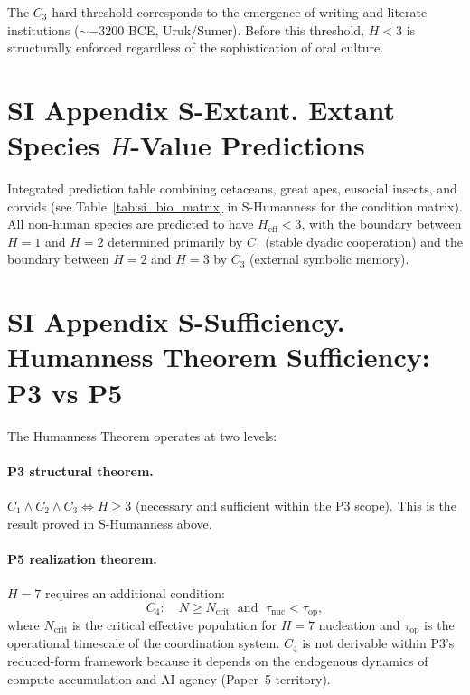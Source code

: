 \documentclass[11pt]{article}
\begin{document}
The $C_3$ hard threshold corresponds to the emergence of writing and literate institutions ($\sim -$3200 BCE, Uruk/Sumer).
Before this threshold, $H < 3$ is structurally enforced regardless of the sophistication of oral culture.


\section*{SI Appendix S-Extant. Extant Species $H$-Value Predictions}

Integrated prediction table combining cetaceans, great apes, eusocial insects, and corvids (see Table~\ref{tab:si_bio_matrix} in S-Humanness for the condition matrix).
All non-human species are predicted to have $H_{\mathrm{eff}} < 3$, with the boundary between $H=1$ and $H=2$ determined primarily by $C_1$ (stable dyadic cooperation) and the boundary between $H=2$ and $H=3$ by $C_3$ (external symbolic memory).


\section*{SI Appendix S-Sufficiency. Humanness Theorem Sufficiency: P3 vs P5}

The Humanness Theorem operates at two levels:

\paragraph{P3 structural theorem.}
$C_1 \wedge C_2 \wedge C_3 \Leftrightarrow H \ge 3$ (necessary and sufficient within the P3 scope).
This is the result proved in S-Humanness above.

\paragraph{P5 realization theorem.}
$H = 7$ requires an additional condition:
\[
C_4: \quad N \ge N_{\mathrm{crit}} \;\text{ and }\; \tau_{\mathrm{nuc}} < \tau_{\mathrm{op}},
\]
where $N_{\mathrm{crit}}$ is the critical effective population for $H=7$ nucleation and $\tau_{\mathrm{op}}$ is the operational timescale of the coordination system.
$C_4$ is not derivable within P3's reduced-form framework because it depends on the endogenous dynamics of compute accumulation and AI agency (Paper~5 territory).
\end{document}

